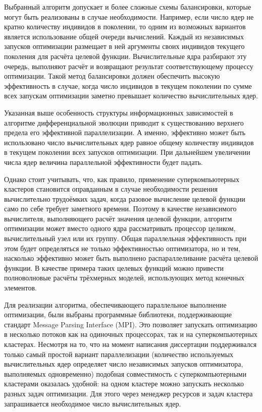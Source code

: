 Выбранный алгоритм допускает и более сложные схемы балансировки,
которые могут быть реализованы в случае необходимости. Например, если
число ядер не кратно количеству индивидов в поколении, то одним из
возможных вариантов является использование общей очереди
вычислений. Каждый из независимых запусков оптимизации размещает в ней
аргументы своих индивидов текущего поколения для расчёта целевой
функции.  Вычислительные ядра разбирают эту очередь, выполняют расчёт
и возвращают результат соответствующему процессу оптимизации. Такой
метод балансировки должен обеспечить высокую эффективность в случае,
когда число индивидов в текущем поколении по сумме всех запускам
оптимизации заметно превышает количество вычислительных ядер.

Указанная выше особенность структуры информационных зависимостей в
алгоритме дифференциальной эволюции приводит к существованию верхнего
предела его эффективной параллелизации.  А именно, эффективно может
быть использовано число вычислительных ядер равное общему количеству
индивидов в текущем поколении всех запусков оптимизации. При
дальнейшем увеличении числа ядер величина параллельной эффективности
будет падать.

Однако стоит учитывать, что, как правило, применение
суперкомпьютерных кластеров становится оправданным в случае
необходимости решения вычислительно трудоёмких задач, когда разовое
вычисление целевой функции само по себе требует заметного
времени. Поэтому в качестве независимого вычислителя, выполняющего
расчёт значения целевой функции, алгоритм оптимизации может вместо
одного ядра  рассматривать процессор целиком, вычислительный
узел или их группу. Общая параллельная эффективность при этом
будет определяться не только эффективностью оптимизатора, но и тем,
насколько эффективно может быть выполнено распараллеливание расчёта
целевой функции.  В качестве примера таких целевых функций можно
привести полноволновые расчёты трёхмерных моделей, использующих метод
конечных элементов.

Для реализации алгоритма, обеспечивающего параллельное выполнение
оптимизации, были выбраны программные библиотеки, поддерживающие
стандарт Message Parsing Interface (MPI). Это позволяет запускать
оптимизацию в несколько потоков как на одиночных процессорах, так и на
суперкомпьютерных кластерах. Несмотря на то, что на момент написания
диссертации поддерживался только самый простой вариант параллелизации
(количество используемых вычислительных ядер определяет число
независимых запусков оптимизатора, выполняемых одновременно) подобная
совместимость с суперкомпьютерными кластерами оказалась удобной: на
одном кластере можно запускать несколько разных задач оптимизации. 
Для этого через менеджер ресурсов и
задач кластера запрашивается необходимое число вычислительных ядер.

